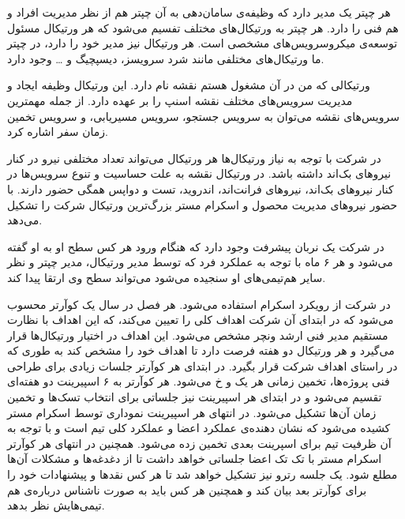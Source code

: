 \documentclass[a4]{report}
\begin{document}
هر چپتر یک مدیر دارد که وظیفه‌ی سامان‌دهی به آن چپتر هم از نظر مدیریت افراد و هم فنی را دارد.
هر چپتر به ورتیکال‌های مختلف تفسیم می‌شود که هر ورتیکال مسئول توسعه‌ی میکروسرویس‌های مشخصی است.
هر ورتیکال نیز مدیر خود را دارد، در چپتر ما ورتیکال‌های مختلفی مانند شرد سرویسز، دیسپچیگ و … وجود دارد.

ورتیکالی که من در آن مشغول هستم نقشه نام دارد. این ورتیکال وظیفه ایجاد و مدیریت سرویس‌های مختلف نقشه اسنپ را بر عهده دارد. از جمله مهمترین سرویس‌های نقشه می‌توان به سرویس جستجو، سرویس مسیریابی، و سرویس تخمین زمان سفر اشاره کرد. 

در شرکت با توجه به نیاز ورتیکال‌ها هر ورتیکال می‌تواند تعداد مختلفی نیرو در کنار نیروهای بک‌اند داشته باشد.
در ورتیکال نقشه به علت حساسیت و تنوع سرویس‌ها در کنار نیروهای بک‌اند،
نیروهای فرانت‌اند، اندروید، تست و دواپس همگی حضور دارند.
با حضور نیروهای مدیریت محصول و اسکرام مستر بزرگ‌ترین ورتیکال شرکت را تشکیل می‌دهد.

در شرکت یک نربان پیشرفت وجود دارد که هنگام ورود هر کس سطح او به او گفته می‌شود و هر ۶ ماه با توجه به عملکرد فرد که توسط مدیر ورتیکال، مدیر چپتر
و نظر سایر هم‌تیمی‌های او سنجیده می‌شود می‌تواند سطح وی ارتقا پیدا کند.

در شرکت از رویکرد اسکرام استفاده می‌شود.
هر فصل در سال یک کوآرتر محسوب می‌شود که در ابتدای آن شرکت اهداف کلی را تعیین می‌کند،
که این اهداف با نظارت مستقیم مدیر فنی ارشد ونچر مشخص می‌شود.
این اهداف در اختیار ورتیکال‌ها قرار می‌گیرد و هر ورتیکال دو هفته فرصت دارد تا اهداف خود را مشخص کند به طوری که در راستای اهداف شرکت قرار بگیرد.
در ابتدای هر کوآرتر جلسات زیادی برای طراحی فنی پروژه‌ها، تخمین زمانی هر یک و ‌خ می‌شود.
هر کوآرتر به ۶ اسپیرینت دو هفته‌ای تقسیم می‌شود و در ابتدای هر اسپیرینت نیز جلساتی برای انتخاب تسک‌ها و تخمین زمان آن‌ها تشکیل می‌شود.
در انتهای هر اسپیرینت نموداری توسط اسکرام مستر کشیده می‌شود که نشان دهنده‌ی عملکرد اعضا و عملکرد کلی تیم است
و با توجه به آن ظرفیت تیم برای اسپرینت بعدی تخمین زده می‌شود.
همچنین در انتهای هر کوآرتر اسکرام مستر با تک تک اعضا جلساتی خواهد داشت تا از دغدغه‌ها و مشکلات آن‌ها مطلع شود.
یک جلسه رترو نیز تشکیل خواهد شد تا هر کس نقدها و پیشنهادات خود را برای کوآرتر بعد بیان کند و
همچنین هر کس باید به صورت ناشناس درباره‌ی هم تیمی‌هایش نظر بدهد.
\end{document}
